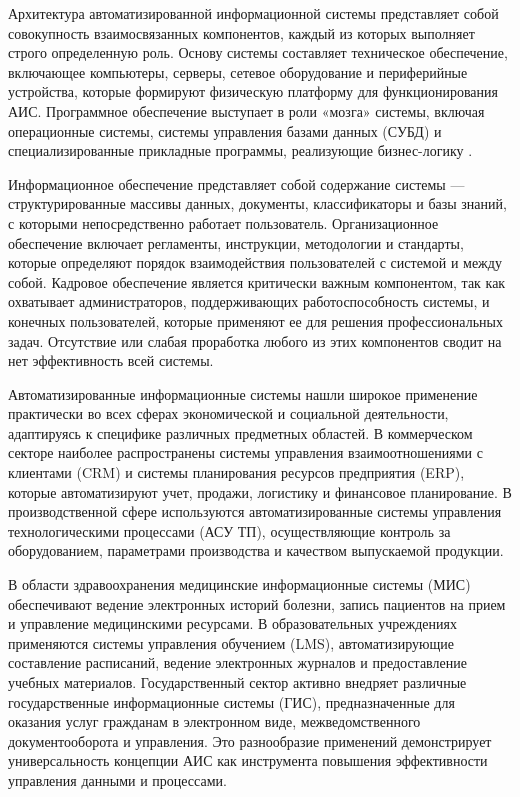 \documentclass{SibFU-docs}
\begin{document}

Архитектура автоматизированной информационной системы представляет собой совокупность взаимосвязанных компонентов, каждый из которых выполняет строго определенную роль. Основу системы составляет техническое обеспечение, включающее компьютеры, серверы, сетевое оборудование и периферийные устройства, которые формируют физическую платформу для функционирования АИС. Программное обеспечение выступает в роли «мозга» системы, включая операционные системы, системы управления базами данных (СУБД) и специализированные прикладные программы, реализующие бизнес-логику \cite{ais_components}.

Информационное обеспечение представляет собой содержание системы — структурированные массивы данных, документы, классификаторы и базы знаний, с которыми непосредственно работает пользователь. Организационное обеспечение включает регламенты, инструкции, методологии и стандарты, которые определяют порядок взаимодействия пользователей с системой и между собой. Кадровое обеспечение является критически важным компонентом, так как охватывает администраторов, поддерживающих работоспособность системы, и конечных пользователей, которые применяют ее для решения профессиональных задач. Отсутствие или слабая проработка любого из этих компонентов сводит на нет эффективность всей системы.


Автоматизированные информационные системы нашли широкое применение практически во всех сферах экономической и социальной деятельности, адаптируясь к специфике различных предметных областей. В коммерческом секторе наиболее распространены системы управления взаимоотношениями с клиентами (CRM) и системы планирования ресурсов предприятия (ERP), которые автоматизируют учет, продажи, логистику и финансовое планирование. В производственной сфере используются автоматизированные системы управления технологическими процессами (АСУ ТП), осуществляющие контроль за оборудованием, параметрами производства и качеством выпускаемой продукции.

В области здравоохранения медицинские информационные системы (МИС) обеспечивают ведение электронных историй болезни, запись пациентов на прием и управление медицинскими ресурсами. В образовательных учреждениях применяются системы управления обучением (LMS), автоматизирующие составление расписаний, ведение электронных журналов и предоставление учебных материалов. Государственный сектор активно внедряет различные государственные информационные системы (ГИС), предназначенные для оказания услуг гражданам в электронном виде, межведомственного документооборота и управления. Это разнообразие применений демонстрирует универсальность концепции АИС как инструмента повышения эффективности управления данными и процессами.
\end{document}
